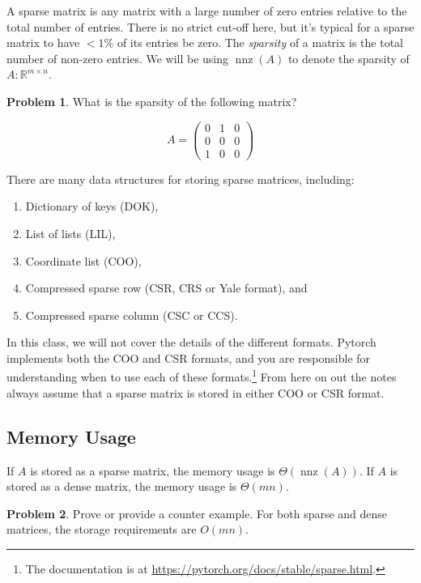 \documentclass[10pt]{article}
\theoremstyle{definition}
\newtheorem{problem}{Problem}
\newcommand{\R}{\mathbb R}
\DeclareMathOperator{\nnz}{nnz}
\begin{document}
A sparse matrix is any matrix with a large number of zero entries relative to the total number of entries.
There is no strict cut-off here, but it's typical for a sparse matrix to have $< 1\%$ of its entries be zero.
The \emph{sparsity} of a matrix is the total number of non-zero entries.
We will be using $\nnz(A)$ to denote the sparsity of $A:\R^{m\times n}$.

\begin{problem}
What is the sparsity of the following matrix?

\begin{equation}
    A = \begin{pmatrix} 0 & 1 & 0 \\ 0 & 0 & 0 \\ 1 & 0 & 0 \end{pmatrix}
\end{equation}
\end{problem}
\vspace{4in}

There are many data structures for storing sparse matrices,
including:
\begin{enumerate}
    \item Dictionary of keys (DOK),
    \item List of lists (LIL),
    \item Coordinate list (COO),
    \item Compressed sparse row (CSR, CRS or Yale format), and
    \item Compressed sparse column (CSC or CCS).
\end{enumerate}
In this class, we will not cover the details of the different formats.
Pytorch implements both the COO and CSR formats,
and you are responsible for understanding when to use each of these formats.\footnote{
    The documentation is at \url{https://pytorch.org/docs/stable/sparse.html}.
}
From here on out the notes always assume that a sparse matrix is stored in either COO or CSR format.

\subsection{Memory Usage}

If $A$ is stored as a sparse matrix,
the memory usage is $\Theta(\nnz(A))$.
If $A$ is stored as a dense matrix,
the memory usage is $\Theta(mn)$.

\begin{problem}
    Prove or provide a counter example.
    For both sparse and dense matrices,
    the storage requirements are $O(mn)$.
    \vspace{4in}
\end{problem}
\end{document}
